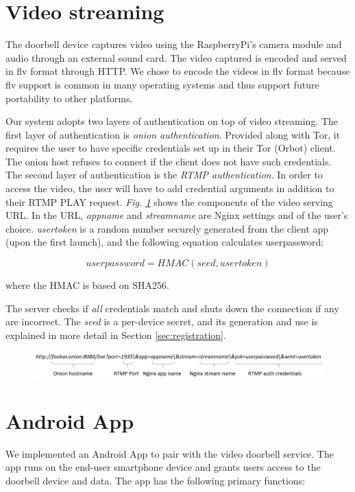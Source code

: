 \section{Video streaming}
The doorbell device captures video using the RaspberryPi's camera module and audio through an external sound card. The video captured is encoded and served in flv format through HTTP. We chose to encode the videos in flv format because flv support is common in many operating systems and thus support future portability to other platforms.

Our system adopts two layers of authentication on top of video streaming. The first layer of authentication is \textit{onion authentication}. Provided along with Tor, it requires the user to have specific credentials set up in their Tor (Orbot) client. The onion host refuses to connect if the client does not have such credentials. The second layer of authentication is the \textit{RTMP authentication}. In order to access the video, the user will have to add credential arguments in addition to their RTMP PLAY request. \textit{Fig. \ref{fig:url}} shows the components of the video serving URL. In the URL, \textit{appname} and \textit{streamname} are Nginx settings and of the user's choice. \textit{usertoken} is a random number securely generated from the client app (upon the first launch), and the following equation calculates userpassword:

\[
userpassword = HMAC(seed, usertoken)
\]

where the HMAC is based on SHA256.

The server checks if \textit{all} credentials match and shuts down the connection if any are incorrect. The \textit{seed} is a per-device secret, and its generation and use is explained in more detail in Section \ref{sec:registration}.

\begin{figure}
	\includegraphics[width=\linewidth]{fig_url.jpg}
	\caption{}
	\label{fig:url}
\end{figure}



\section{Android App}
We implemented an Android App to pair with the video doorbell service. The app runs on the end-user smartphone device and grants users access to the doorbell device and data. The app has the following primary functions:

